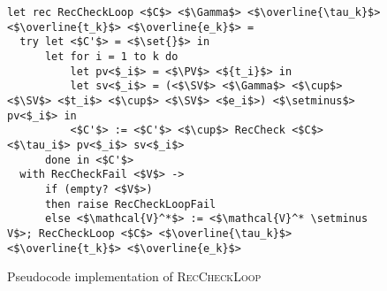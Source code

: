 \begin{figure}
\centering

\begin{verbatim}
let rec RecCheckLoop <$C$> <$\Gamma$> <$\overline{\tau_k}$> <$\overline{t_k}$> <$\overline{e_k}$> =
  try let <$C'$> = <$\set{}$> in
      let for i = 1 to k do
          let pv<$_i$> = <$\PV$> <${t_i}$> in
          let sv<$_i$> = (<$\SV$> <$\Gamma$> <$\cup$> <$\SV$> <$t_i$> <$\cup$> <$\SV$> <$e_i$>) <$\setminus$> pv<$_i$> in
          <$C'$> := <$C'$> <$\cup$> RecCheck <$C$> <$\tau_i$> pv<$_i$> sv<$_i$>
      done in <$C'$>
  with RecCheckFail <$V$> ->
      if (empty? <$V$>)
      then raise RecCheckLoopFail
      else <$\mathcal{V}^*$> := <$\mathcal{V}^* \setminus V$>; RecCheckLoop <$C$> <$\overline{\tau_k}$> <$\overline{t_k}$> <$\overline{e_k}$>
\end{verbatim}

\caption{Pseudocode implementation of \textsc{RecCheckLoop}}
\label{fig:helpers}
\end{figure}

